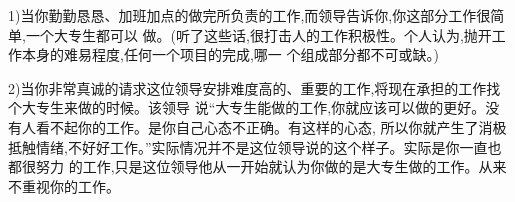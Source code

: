 \documentclass[11pt]{article}
\begin{document}
\begin{myquote}
  1)当你勤勤恳恳、加班加点的做完所负责的工作,而领导告诉你,你这部分工作很简单,一个大专生都可以
  做。(听了这些话,很打击人的工作积极性。个人认为,抛开工作本身的难易程度,任何一个项目的完成,哪一
  个组成部分都不可或缺。)
\end{myquote}

\begin{comment}
  这个不是一个成熟、高效的领导行为。成熟、高效的领导,需要鼓励员工,不能伤害员工的感情。到底这个工作
  是否大专学生可以做不重要,就是不能说出来。但是这个你是不可以改变他的。我们的领导,的确有很多错误的
  管理理念,其中包括什么事都认为不需要判断、不需要创新,所以他们会说这些工作是大专生可以做。其实做起
  来就没有这么高效。

  问题是,你是否真的使用了你的判断力,你是否更好地掌握了重点?你是否用了更有创新的理念来完成你的任
  务?你能够做的,就只有尽可能地证明、表达你工作的成绩。如果你可以证明一个大专生不能做的比你好,就更
  有说服力。他可以看到组织里的所有任务,你不能看到,所以你的比较不会比他的全面,在这方面,你要说服他
  是不容易的。虽然你的领导可能不成熟,他也有一定的经验与技能,也有他的目标。如果你真的能够让他认识到
  你是能抓重点的,能作判断的,有创新的,积极主动地,支持他的目标的,他对你的成见可能就可以解决了。
\end{comment}

\begin{myquote}
2)当你非常真诚的请求这位领导安排难度高的、重要的工作,将现在承担的工作找个大专生来做的时候。该领导
说``大专生能做的工作,你就应该可以做的更好。没有人看不起你的工作。是你自己心态不正确。有这样的心态,
所以你就产生了消极抵触情绪,不好好工作。''实际情况并不是这位领导说的这个样子。实际是你一直也都很努力
的工作,只是这位领导他从一开始就认为你做的是大专生做的工作。从来不重视你的工作。
\end{myquote}

\begin{comment}
  如果他说大专生都可以做的,他已经看不起你的工作了。这样不对。虽然他是领导,也不应该这样对待员
  工。(中国的下一个思想解放,我希望就是领导们知道自己没有特权!权力,只是实施更大更重的任务的工具而
  已!)

  但是他的要求是对的。如果你真的能够承担更复杂的任务,你就需要能够把简单的任务作的更好。好的因素,我
  已经在上面表达过了。能够抓重点,能作判断,有创新意志,同时积极主动,承担责任,重视承诺,让领导有一
  个安全感,可以信赖你。

  你要这样要求自己。可能应付这类的领导,你也需要有坚强的意志,不让领导的评语伤害。这样会增加成功的机
  会。

  这个很重要,我不鼓励关注人家的不对;只关注如何解决问题。
\end{comment}
\end{document}
